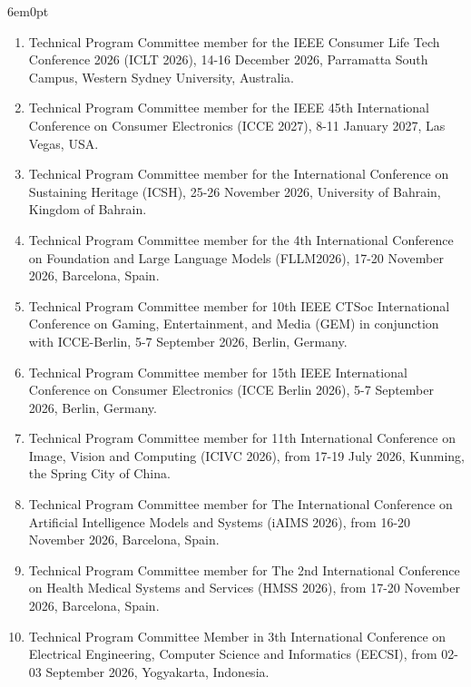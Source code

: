\documentclass[11pt,a4paper]{moderncv}
\begin{document}
\begin{adjustwidth}{6em}{0pt}
	\begin{enumerate}
		
		
		\item Technical Program Committee member for the IEEE Consumer Life Tech Conference 2026 (ICLT 2026), 14-16 December 2026, Parramatta South Campus, Western Sydney University, Australia.
		
		\item Technical Program Committee member for the IEEE 45th International Conference on Consumer Electronics (ICCE 2027), 8-11 January 2027, Las Vegas, USA.
		
		\item Technical Program Committee member for the International Conference on Sustaining Heritage (ICSH), 25-26 November 2026, University of Bahrain, Kingdom of Bahrain.
		
		\item Technical Program Committee member for the 4th International Conference on Foundation and Large Language Models (FLLM2026), 17-20 November 2026, Barcelona, Spain.
		
		\item Technical Program Committee member for 10th IEEE CTSoc International Conference on Gaming, Entertainment, and Media (GEM) in conjunction with ICCE-Berlin, 5-7 September 2026, Berlin, Germany.
		
		\item Technical Program Committee member for 15th IEEE International Conference on Consumer Electronics (ICCE Berlin 2026), 5-7 September 2026, Berlin, Germany.
		
		\item Technical Program Committee member for 11th International Conference on Image, Vision and Computing (ICIVC 2026), from 17-19 July 2026, Kunming, the Spring City of China.
		
		\item Technical Program Committee member for The International Conference on Artificial Intelligence Models and Systems (iAIMS 2026), from 16-20 November 2026, Barcelona, Spain. 
		
		\item Technical Program Committee member for The 2nd International Conference on Health Medical Systems and Services (HMSS 2026), from 17-20 November 2026, Barcelona, Spain. 
		
		\item Technical Program Committee Member in 3th International Conference on Electrical Engineering, Computer Science and Informatics (EECSI), from 02-03 September 2026, Yogyakarta, Indonesia. 
				

\end{enumerate}
\end{adjustwidth}
\end{document}
